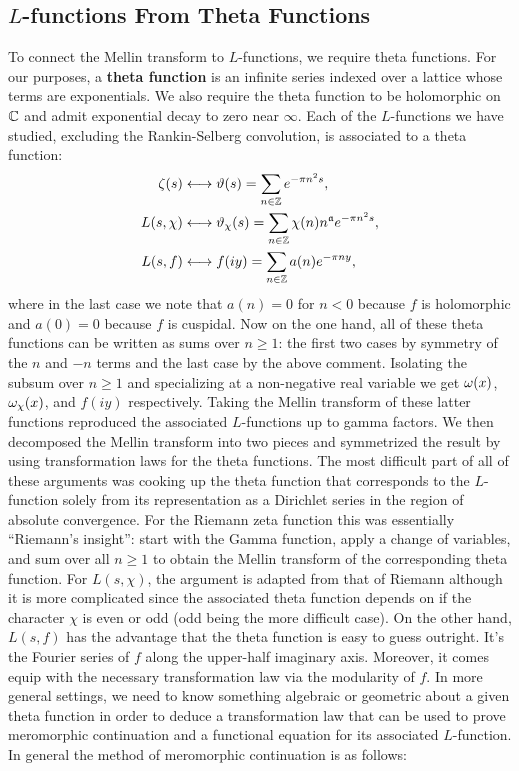     \subsection*{\texorpdfstring{$L$}{L}-functions From Theta Functions}
      To connect the Mellin transform to $L$-functions, we require theta functions. For our purposes, a \textbf{theta function} is an infinite series indexed over a lattice whose terms are exponentials. We also require the theta function to be holomorphic on $\mathbb{C}$ and admit exponential decay to zero near $\infty$. Each of the $L$-functions we have studied, excluding the Rankin-Selberg convolution, is associated to a theta function:
      \begin{align*}
        \zeta(s) &\longleftrightarrow \vartheta(s) = \sum_{n \in \mathbb{Z}}e^{-\pi n^{2}s}, \\
        L(s,\chi) &\longleftrightarrow \vartheta_{\chi}(s) = \sum_{n \in \mathbb{Z}}\chi(n)n^{\mathfrak{a}}e^{-\pi n^{2}s}, \\
        L(s,f) &\longleftrightarrow f(iy) = \sum_{n \in \mathbb{Z}}a(n)e^{-\pi ny},
      \end{align*}
      where in the last case we note that $a(n) = 0$ for $n < 0$ because $f$ is holomorphic and $a(0) = 0$ because $f$ is cuspidal. Now on the one hand, all of these theta functions can be written as sums over $n \ge 1$: the first two cases by symmetry of the $n$ and $-n$ terms and the last case by the above comment. Isolating the subsum over $n \ge 1$ and specializing at a non-negative real variable we get $\omega(x)$, $\omega_{\chi}(x)$, and $f(iy)$ respectively. Taking the Mellin transform of these latter functions reproduced the associated $L$-functions up to gamma factors. We then decomposed the Mellin transform into two pieces and symmetrized the result by using transformation laws for the theta functions. The most difficult part of all of these arguments was cooking up the theta function that corresponds to the $L$-function solely from its representation as a Dirichlet series in the region of absolute convergence. For the Riemann zeta function this was essentially ``Riemann's insight'': start with the Gamma function, apply a change of variables, and sum over all $n \ge 1$ to obtain the Mellin transform of the corresponding theta function. For $L(s,\chi)$, the argument is adapted from that of Riemann although it is more complicated since the associated theta function depends on if the character $\chi$ is even or odd (odd being the more difficult case). On the other hand, $L(s,f)$ has the advantage that the theta function is easy to guess outright. It's the Fourier series of $f$ along the upper-half imaginary axis. Moreover, it comes equip with the necessary transformation law via the modularity of $f$. In more general settings, we need to know something algebraic or geometric about a given theta function in order to deduce a transformation law that can be used to prove meromorphic continuation and a functional equation for its associated $L$-function. In general the method of meromorphic continuation is as follows:

